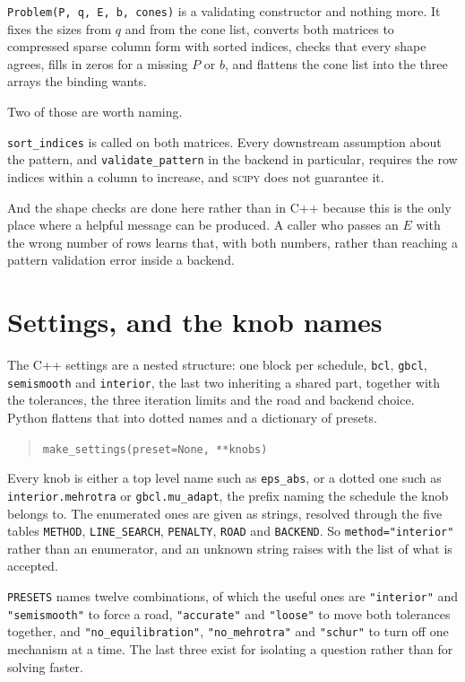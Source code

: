 \documentclass[a4paper,11pt]{book}
\theoremstyle{plain}
\theoremstyle{definition}
\theoremstyle{remark}
\numberwithin{equation}{chapter}
\numberwithin{algorithm}{chapter}
\begin{document}
	\texttt{Problem(P, q, E, b, cones)} is a validating constructor and nothing
	more. It fixes the sizes from $q$ and from the cone list, converts both
	matrices to compressed sparse column form with sorted indices, checks that
	every shape agrees, fills in zeros for a missing $P$ or $b$, and flattens the
	cone list into the three arrays the binding wants.

	Two of those are worth naming.

	\texttt{sort\_indices} is called on both matrices. Every downstream assumption
	about the pattern, and \texttt{validate\_pattern} in the backend in
	particular, requires the row indices within a column to increase, and
	\textsc{scipy} does not guarantee it.

	And the shape checks are done here rather than in C++ because this is the only
	place where a helpful message can be produced. A caller who passes an $E$ with
	the wrong number of rows learns that, with both numbers, rather than reaching a
	pattern validation error inside a backend.

	\section{Settings, and the knob names}

	The C++ settings are a nested structure: one block per schedule,
	\texttt{bcl}, \texttt{gbcl}, \texttt{semismooth} and \texttt{interior}, the
	last two inheriting a shared part, together with the tolerances, the three
	iteration limits and the road and backend choice. Python flattens that into
	dotted names and a dictionary of presets.

	\begin{quote}
		\texttt{make\_settings(preset=None, **knobs)}
	\end{quote}

	Every knob is either a top level name such as \texttt{eps\_abs}, or a dotted
	one such as \texttt{interior.mehrotra} or \texttt{gbcl.mu\_adapt}, the prefix
	naming the schedule the knob belongs to. The enumerated ones are given as
	strings, resolved through the five tables \texttt{METHOD},
	\texttt{LINE\_SEARCH}, \texttt{PENALTY}, \texttt{ROAD} and \texttt{BACKEND}.
	So \texttt{method="interior"} rather than an enumerator, and an unknown string
	raises with the list of what is accepted.

	\texttt{PRESETS} names twelve combinations, of which the useful ones are
	\texttt{"interior"} and \texttt{"semismooth"} to force a road,
	\texttt{"accurate"} and \texttt{"loose"} to move both tolerances together, and
	\texttt{"no\_equilibration"}, \texttt{"no\_mehrotra"} and \texttt{"schur"} to
	turn off one mechanism at a time. The last three exist for isolating a
	question rather than for solving faster.
\end{document}
